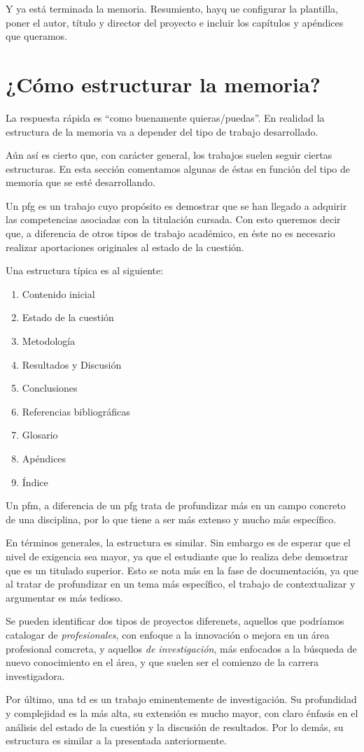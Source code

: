 Y ya está terminada la memoria. Resumiento, hayq ue configurar la plantilla, poner el autor, título y director del proyecto e incluir los capítulos y apéndices que queramos.

\section{¿Cómo estructurar la memoria?}

La respuesta rápida es ``como buenamente quieras/puedas''. En realidad la estructura de la memoria va a depender del tipo de trabajo desarrollado.

Aún así es cierto que, con carácter general, los trabajos suelen seguir ciertas estructuras. En esta sección comentamos algunas de éstas en función del tipo de memoria que se esté desarrollando.

Un \gls{pfg} es un trabajo cuyo propósito es demostrar que se han llegado a adquirir las competencias asociadas con la titulación cursada. Con esto queremos decir que, a diferencia de otros tipos de trabajo académico, en éste no es necesario realizar aportaciones originales al estado de la cuestión.

Una estructura típica es al siguiente:

\begin{enumerate}
    \item Contenido inicial
    \item Estado de la cuestión
    \item Metodología
    \item Resultados y Discusión
    \item Conclusiones
    \item Referencias bibliográficas
    \item Glosario
    \item Apéndices
    \item Índice
\end{enumerate}

Un \gls{pfm}, a diferencia de un \gls{pfg} trata de profundizar más en un campo concreto de una disciplina, por lo que tiene a ser más extenso y mucho más específico.

En términos generales, la estructura es similar. Sin embargo es de esperar que el nivel de exigencia sea mayor, ya que el estudiante que lo realiza debe demostrar que es un titulado superior. Esto se nota más en la fase de documentación, ya que al tratar de profundizar en un tema más específico, el trabajo de contextualizar y argumentar es más tedioso.

Se pueden identificar dos tipos de proyectos diferenets, aquellos que podríamos catalogar de \textit{profesionales}, con enfoque a la innovación o mejora en un área profesional comcreta, y aquellos \textit{de investigación}, más enfocados a la búsqueda de nuevo conocimiento en el área, y que suelen ser el comienzo de la carrera investigadora.

Por último, una \gls{td} es un trabajo eminentemente de investigación. Su profundidad y complejidad es la más alta, su extensión es mucho mayor, con claro énfasis en el análisis del estado de la cuestión y la discusión de resultados. Por lo demás, su estructura es similar a la presentada anteriormente.